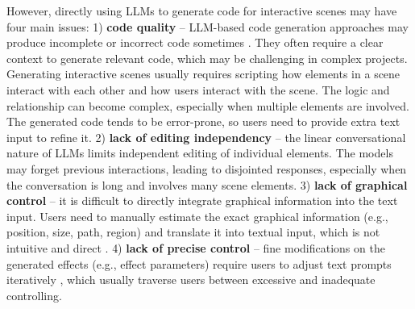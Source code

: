 However, {directly using LLMs to generate code for interactive scenes}
may have four main {issues:}
1) \textbf{code quality} -- %
{LLM-based code generation approaches}
may produce incomplete or incorrect code sometimes \cite{li2022competition,nijkamp2022codegen,roziere2023code}. {They} %
often require a clear context to generate relevant code, which may be challenging in complex projects. {Generating} %
interactive scenes %
usually requires scripting how elements in {a} scene 
interact with each other and how users {interact} %
with the scene. The logic and relationship can become complex, especially when multiple elements are involved. {The generated code tends to be error-prone, so users need to provide extra text input to refine it.}
2) \textbf{lack of {editing} independency} -- the linear conversational nature of LLMs limits independent editing of individual elements. 
The model{s} may forget previous interactions, leading to disjointed responses, {especially when the conversation is long and involves many {scene} elements}. 
3) \textbf{lack of graphical control} -- %
{it is difficult} to directly integrate graphical information into the text input. {Users} need to manually estimate the {exact} 
graphical information (e.g., position, size, path, region) and translate it into textual input, which is not intuitive and direct \cite{masson2024directgpt}. %
{4) \textbf{lack of precise control} -- fine modifications on the generated effects (e.g., effect parameters) require users to adjust text prompts iteratively , which usually traverse users between excessive and inadequate controlling.}

